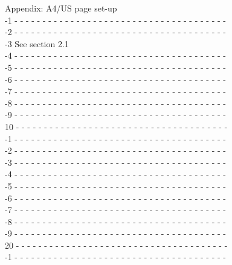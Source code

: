 \documentclass{cmspaper}
\begin{document}
{\small \begin{flushleft}
Appendix: A4/US page set-up\\
-1 - - - - - - - - - - - - - - - - - - - - - - - - - - - - - - - - - - - - - -\\
-2 - - - - - - - - - - - - - - - - - - - - - - - - - - - - - - - - - - - - - -\\
-3		See section 2.1\\
-4 - - - - - - - - - - - - - - - - - - - - - - - - - - - - - - - - - - - - - -\\
-5 - - - - - - - - - - - - - - - - - - - - - - - - - - - - - - - - - - - - - -\\
-6 - - - - - - - - - - - - - - - - - - - - - - - - - - - - - - - - - - - - - -\\
-7 - - - - - - - - - - - - - - - - - - - - - - - - - - - - - - - - - - - - - -\\
-8 - - - - - - - - - - - - - - - - - - - - - - - - - - - - - - - - - - - - - -\\
-9 - - - - - - - - - - - - - - - - - - - - - - - - - - - - - - - - - - - - - -\\
10 - - - - - - - - - - - - - - - - - - - - - - - - - - - - - - - - - - - - - -\\
-1 - - - - - - - - - - - - - - - - - - - - - - - - - - - - - - - - - - - - - -\\
-2 - - - - - - - - - - - - - - - - - - - - - - - - - - - - - - - - - - - - - -\\
-3 - - - - - - - - - - - - - - - - - - - - - - - - - - - - - - - - - - - - - -\\
-4 - - - - - - - - - - - - - - - - - - - - - - - - - - - - - - - - - - - - - -\\
-5 - - - - - - - - - - - - - - - - - - - - - - - - - - - - - - - - - - - - - -\\
-6 - - - - - - - - - - - - - - - - - - - - - - - - - - - - - - - - - - - - - -\\
-7 - - - - - - - - - - - - - - - - - - - - - - - - - - - - - - - - - - - - - -\\
-8 - - - - - - - - - - - - - - - - - - - - - - - - - - - - - - - - - - - - - -\\
-9 - - - - - - - - - - - - - - - - - - - - - - - - - - - - - - - - - - - - - -\\
20 - - - - - - - - - - - - - - - - - - - - - - - - - - - - - - - - - - - - - -\\
-1 - - - - - - - - - - - - - - - - - - - - - - - - - - - - - - - - - - - - - -\\

\end{flushleft}}
\end{document}
